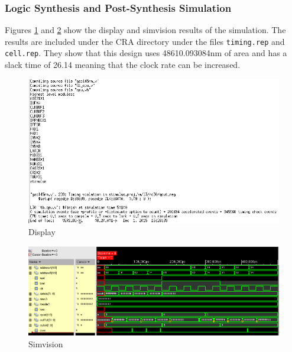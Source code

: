 \documentclass[12pt]{article}
\begin{document}
\subsubsection{Logic Synthesis and Post-Synthesis Simulation}
Figures \ref{fig:synth-text-CRA} and \ref{fig:synth-test-CRA} show the display and simvision results of the simulation. The results are included under the CRA directory under the files \texttt{timing.rep} and \texttt{cell.rep}. They show that this design uses 48610.093084nm of area and has a slack time of 26.14 meaning that the clock rate can be increased.
\begin{figure}[H]
\centering
\includegraphics[width=.7\linewidth]{../CRA/synth-text}
\caption{Display}
\label{fig:synth-text-CRA}
\end{figure}
\begin{figure}[H]
\centering
\includegraphics[width=\linewidth]{../CRA/synth-test}
\caption{Simvision}
\label{fig:synth-test-CRA}
\end{figure}
\end{document}

